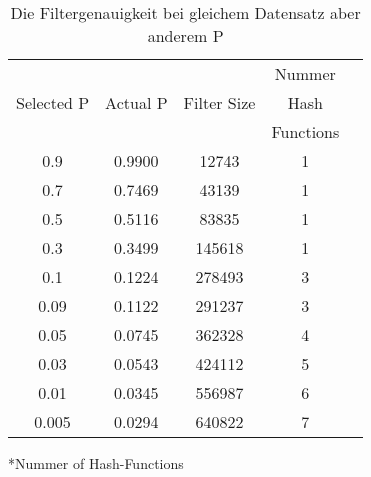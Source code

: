 \documentclass[11pt]{article}
\begin{document}
    \begin{table}[htp]
        \label{tab:summary}
        \begin{center}
            \begin{tabular}{ccccc}
                \hline
                &                 &             &Nummer     \\
                Selected P  & Actual P        & Filter Size &Hash       \\
                &                 &             &Functions	\\
                \hline

                0.9         & 0.9900          &  12743       & 1  	\\
                0.7         & 0.7469          &  43139       & 1  	\\
                0.5         & 0.5116          &  83835       & 1  	\\
                0.3         & 0.3499          &  145618      & 1  	\\
                0.1         & 0.1224          &  278493      & 3  	\\
                0.09        & 0.1122          &  291237      & 3  	\\
                0.05        & 0.0745          &  362328      & 4    \\
                0.03        & 0.0543          &  424112      & 5  	\\
                0.01        & 0.0345          &  556987      & 6  	\\
                0.005       & 0.0294          &  640822      & 7  	\\
                \hline
            \end{tabular}
            *Nummer of Hash-Functions
        \end{center}
        \caption{Die Filtergenauigkeit bei gleichem Datensatz aber anderem P}
    \end{table}
\end{document}
